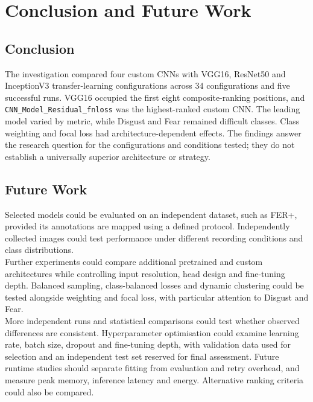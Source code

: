 \documentclass[10pt, a4paper]{article}
\let\oldsection\section
\renewcommand{\section}{%
    \Needspace{4\baselineskip}%
    \oldsection
}
\let\oldsubsection\subsection
\renewcommand{\subsection}{%
    \Needspace{4\baselineskip}%
    \oldsubsection
}
\begin{document}
	
	\section{Conclusion and Future Work}
	
		\subsection{Conclusion}
		
			The investigation compared four custom CNNs with VGG16, ResNet50 and InceptionV3 transfer-learning configurations across $34$ configurations and five successful runs. VGG16 occupied the first eight composite-ranking positions, and \texttt{CNN\_Model\_Residual\_fnloss} was the highest-ranked custom CNN. The leading model varied by metric, while Disgust and Fear remained difficult classes. Class weighting and focal loss had architecture-dependent effects. The findings answer the research question for the configurations and conditions tested; they do not establish a universally superior architecture or strategy.
		
		\subsection{Future Work}
			
			Selected models could be evaluated on an independent dataset, such as FER+, provided its annotations are mapped using a defined protocol. Independently collected images could test performance under different recording conditions and class distributions.\\
			Further experiments could compare additional pretrained and custom architectures while controlling input resolution, head design and fine-tuning depth. Balanced sampling, class-balanced losses and dynamic clustering could be tested alongside weighting and focal loss, with particular attention to Disgust and Fear.\\
			More independent runs and statistical comparisons could test whether observed differences are consistent. Hyperparameter optimisation could examine learning rate, batch size, dropout and fine-tuning depth, with validation data used for selection and an independent test set reserved for final assessment. Future runtime studies should separate fitting from evaluation and retry overhead, and measure peak memory, inference latency and energy. Alternative ranking criteria could also be compared.
				
	
	\printbibliography[heading=bibintoc, title={References}]
\end{document}
